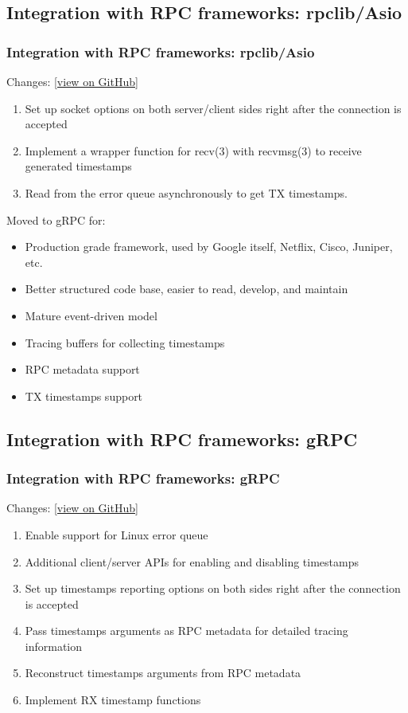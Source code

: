 \documentclass[10pt]{beamer}
\begin{document}
\subsection{Integration with RPC frameworks: rpclib/Asio}
\begin{frame}
\frametitle{Integration with RPC frameworks: rpclib/Asio}
    Changes:
\href{https://github.com/kyechou/rpclib/commit/568cc625ceaff7c3a9579db56b1d3cea513d7f55}{[view
    on GitHub]}
\begin{enumerate}
\item Set up socket options on both server/client sides right after the
      connection is accepted
\item Implement a wrapper function for recv(3) with recvmsg(3) to receive
      generated timestamps
\item Read from the error queue asynchronously to get TX timestamps.
\end{enumerate}

Moved to gRPC for:
\begin{itemize}
\item Production grade framework, used by Google itself, Netflix, Cisco,
      Juniper, etc.
\item Better structured code base, easier to read, develop, and maintain
\item Mature event-driven model
\item Tracing buffers for collecting timestamps
\item RPC metadata support
\item TX timestamps support
\end{itemize}
\end{frame}

\subsection{Integration with RPC frameworks: gRPC}
\begin{frame}
\frametitle{Integration with RPC frameworks: gRPC}
    Changes:
\href{https://github.com/kyechou/grpc/commit/8fe57c107e0cff374ad4feba9a12231d877f5d31}{[view
    on GitHub]}
\begin{enumerate}
\item Enable support for Linux error queue
\item Additional client/server APIs for enabling and disabling timestamps
\item Set up timestamps reporting options on both sides right after the
      connection is accepted
\item Pass timestamps arguments as RPC metadata for detailed tracing information
\item Reconstruct timestamps arguments from RPC metadata
\item Implement RX timestamp functions
\end{enumerate}
\end{frame}
\end{document}
